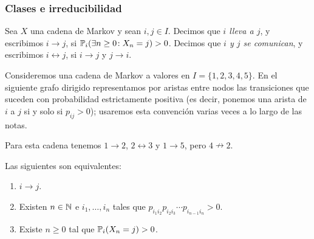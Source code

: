 \subsubsection{Clases e irreducibilidad}

\begin{defn}
Sea $X$ una cadena de Markov y sean $i,j\in I$.
Decimos que \emph{$i$ lleva a $j$}, y escribimos $i\to j$, si $\mathbb{P}_i(\exists n\geq0\!:X_n=j)>0$.
Decimos que \emph{$i$ y $j$ se comunican}, y escribimos $i\leftrightarrow j$, si $i\to j$ y $j\to i$.
\end{defn}

\begin{ex}
Consideremos una cadena de Markov a valores en $I=\{1,2,3,4,5\}$.
En el siguiente grafo dirigido representamos por aristas entre nodos las transiciones que suceden con probabilidad estrictamente positiva (es decir, ponemos una arista de $i$ a $j$ si y solo si $p_{ij}>0$); usaremos esta convención varias veces a lo largo de las notas.
\begin{center}
\end{center}
Para esta cadena tenemos $1\to2$, $2\leftrightarrow3$ y $1\to5$, pero $4\nrightarrow2$.
\end{ex}

\begin{prop}
Las siguientes son equivalentes:
\begin{enumerate}[label=\uptext{(\arabic*)}]
\item $i\to j$.
\item Existen $n\in\mathbb{N}$ e $i_1,\dotsc,i_n$ tales que $p_{i_1i_2}p_{i_2i_3}\dotsm p_{i_{n-1}i_n}>0$.
\item Existe $n\geq0$ tal que $\mathbb{P}_i(X_n=j)>0$.
\end{enumerate}
\end{prop}

